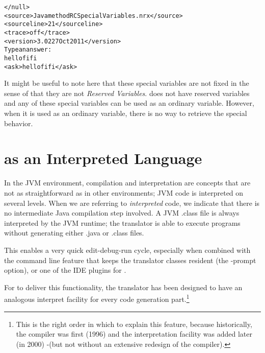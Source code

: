 {\begin{alltt}
</null>
<source>Java method RCSpecialVariables.nrx</source>
<sourceline>21</sourceline>
<trace>off</trace>
<version>\nr{} 3.02 27 Oct 2011</version>
Type an answer:
hello fifi
<ask>hello fifi</ask>
\end{alltt}
It might be useful to note here that these special variables are not
fixed in the sense of that they are not \emph{Reserved Variables}. \nr{}
does not have reserved variables and any of these special variables
can be used as an ordinary variable. However, when it is used as an
ordinary variable, there is no way to retrieve the special behavior.


\chapter{\nr{} as an Interpreted Language}\label{interpreted}
In the JVM environment, compilation and interpretation are concepts
that are not as straightforward as in other environments; JVM code is
interpreted on several levels. When we are referring to
\emph{interpreted} \nr{} code, we indicate that there is no
intermediate Java compilation step involved. A JVM .class file is
always interpreted by the JVM runtime; the \nr{} translator is able to
execute programs without generating either .java or .class files.

This enables a very quick edit-debug-run cycle, especially when
combined with the command line feature that keeps the translator
classes resident (the -prompt option), or one of the IDE plugins for
\nr{}.

For \nr{} to deliver this functionality, the translator has been
designed to have an analogous interpret facility for every code
generation part.\footnote{This is the right order in which to explain this
  feature, because historically, the compiler was first (1996) and the
  interpretation facility was added later (in 2000) -(but not without an
  extensive redesign of the compiler).}




% 


}
